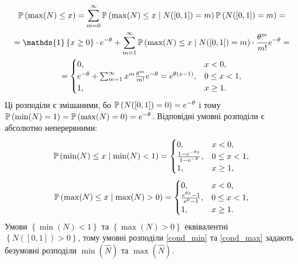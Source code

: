 \begin{gather}
    \P{\max(N) \leq x} = \sum_{m=0}^{\infty} \P{\max(N) \leq x \mid N([0, 1]) = m} \P{N([0, 1]) = m} = \\ \nonumber
     = \mathds{1}\left\{x\geq 0\right\}\cdot e^{-\theta} +
    \sum_{m=1}^{\infty} \P{\max(N) \leq x \mid N([0, 1]) = m} \cdot \frac{\theta^m}{m!} e^{-\theta} = \\ \nonumber
    = \begin{cases}
        0, & x < 0, \\
        e^{-\theta} + \sum_{m=1}^{\infty} x^m \frac{\theta^m}{m!} e^{-\theta} = e^{\theta(x-1)}, & 0 \leq x < 1, \\
        1, & x \geq 1.
    \end{cases}
\end{gather}
Ці розподіли є змішаними, бо $\P{N([0, 1]) = 0} = e^{-\theta}$ і тому
$\P{\min(N) = 1} = \P{\max(N) = 0} = e^{-\theta}$. 
Відповідні умовні розподіли є абсолютно неперервними:
\begin{gather}\label{cond_min}
    \P{\min(N) \leq x \mid \min(N) < 1} = 
    \begin{cases}
        0, & x < 0, \\
        \frac{1-e^{-\theta x}}{1-e^{-\theta}}, & 0 \leq x < 1, \\
        1, & x \geq 1,
    \end{cases}
\end{gather}
\begin{gather}\label{cond_max}
    \P{\max(N) \leq x \mid \max(N) > 0} = 
    \begin{cases}
        0, & x < 0, \\
        \frac{e^{\theta x} - 1}{e^{\theta} - 1}, & 0 \leq x < 1, \\
        1, & x \geq 1.
    \end{cases}
\end{gather}
Умови $\left\{ \min(N) < 1\right\}$ та $\left\{ \max(N) > 0\right\}$
еквівалентні $\left\{N([0, 1]) > 0 \right\}$, тому 
умовні розподіли \eqref{cond_min} та \eqref{cond_max} 
задають безумовні розподіли $\min(\widehat{N})$ та $\max(\widehat{N})$.

